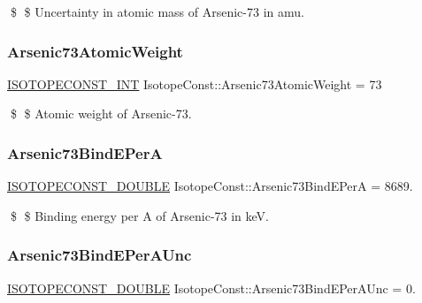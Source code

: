 \$ \$ Uncertainty in atomic mass of Arsenic-\/73 in amu. \mbox{\label{group___isotope_const-_arsenic-_as73_ga60e8986f758fdf1cf75372afa41e15a0}} 
\subsubsection{\texorpdfstring{Arsenic73\+Atomic\+Weight}{Arsenic73AtomicWeight}}
{\footnotesize\ttfamily \mbox{\hyperlink{group___isotope_const-_macros_ga5f18360b3e99483a35c32d789e62621c}{I\+S\+O\+T\+O\+P\+E\+C\+O\+N\+S\+T\+\_\+\+I\+NT}} Isotope\+Const\+::\+Arsenic73\+Atomic\+Weight = 73}

\$ \$ Atomic weight of Arsenic-\/73. \mbox{\label{group___isotope_const-_arsenic-_as73_ga00723d4aa84e8700446eac95eb043576}} 
\subsubsection{\texorpdfstring{Arsenic73\+Bind\+E\+PerA}{Arsenic73BindEPerA}}
{\footnotesize\ttfamily \mbox{\hyperlink{group___isotope_const-_macros_ga8f45a7272ce02c0b4c65c44636ed719a}{I\+S\+O\+T\+O\+P\+E\+C\+O\+N\+S\+T\+\_\+\+D\+O\+U\+B\+LE}} Isotope\+Const\+::\+Arsenic73\+Bind\+E\+PerA = 8689.}

\$ \$ Binding energy per A of Arsenic-\/73 in keV. \mbox{\label{group___isotope_const-_arsenic-_as73_ga633469a70047746ebb860c5e0911a26c}} 
\subsubsection{\texorpdfstring{Arsenic73\+Bind\+E\+Per\+A\+Unc}{Arsenic73BindEPerAUnc}}
{\footnotesize\ttfamily \mbox{\hyperlink{group___isotope_const-_macros_ga8f45a7272ce02c0b4c65c44636ed719a}{I\+S\+O\+T\+O\+P\+E\+C\+O\+N\+S\+T\+\_\+\+D\+O\+U\+B\+LE}} Isotope\+Const\+::\+Arsenic73\+Bind\+E\+Per\+A\+Unc = 0.}

